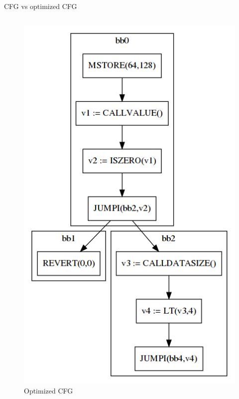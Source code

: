 \documentclass[11pt]{beamer}
\begin{document}
\begin{frame}{CFG vs optimized CFG}
\begin{columns}
\begin{figure}
    \includegraphics[scale=0.2]{figures/graph3.png}
    \caption{Optimized CFG}
\end{figure}
\end{columns}
\end{frame}
\end{document}
